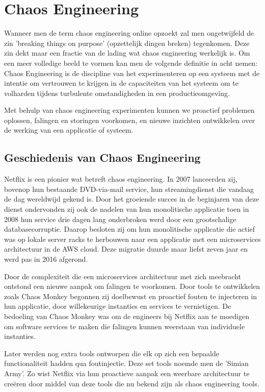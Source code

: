 \section{Chaos Engineering}
\label{ch:chaos}

Wanneer men de term chaos engineering online opzoekt zal men ongetwijfeld de zin 'breaking things on purpose' (opzettelijk dingen breken) tegenkomen. Deze zin dekt maar een fractie van de lading wat chaos engineering werkelijk is. Om een meer volledige beeld te vormen kan men de volgende definitie in acht nemen: Chaos Engineering is de discipline van het experimenteren op een systeem met de intentie om vertrouwen te krijgen in de capaciteiten van het systeem om te volharden tijdens turbulente omstandigheden in een productieomgeving. \autocite{Eliot2019}

Met behulp van chaos engineering experimenten kunnen we proactief problemen oplossen, falingen en storingen voorkomen, en nieuwe inzichten ontwikkelen over de werking van een applicatie of systeem.  

\subsection{Geschiedenis van Chaos Engineering}

Netflix is een pionier wat betreft chaos engineering. In 2007 lanceerden zij, bovenop hun bestaande DVD-via-mail service, hun streamingdienst die vandaag de dag wereldwijd gekend is. Door het groeiende succes in de beginjaren van deze dienst ondervonden zij ook de nadelen van hun monolitische applicatie toen in 2008 hun service drie dagen lang onderbroken werd door een grootschalige databasecorruptie. 
Daarop besloten zij om hun monolitische applicatie die actief was op lokale server racks te herbouwen naar een applicatie met een microservices architectuur in de AWS cloud. Deze migratie duurde maar liefst zeven jaar en werd pas in 2016 afgerond.

Door de complexiteit die een microservices architectuur met zich meebracht ontstond een nieuwe aanpak om falingen te voorkomen. Door tools te ontwikkelen zoals Chaos Monkey begonnen zij doelbewust en proactief fouten te injecteren in hun applicatie, door willekeurige instanties en services te vernietigen. De bedoeling van Chaos Monkey was om de engineers bij Netflix aan te moedigen om software services te maken die falingen kunnen weerstaan van individuele instanties. \autocite{Basiri2016}  

Later werden nog extra tools ontworpen die elk op zich een bepaalde functionaliteit hadden qua foutinjectie. Deze set tools noemde men de 'Simian Army'. Zo wist Netflix via hun proactieve aanpak een weerbare architectuur te creëren door middel van deze tools die nu bekend zijn als chaos engineering tools.

